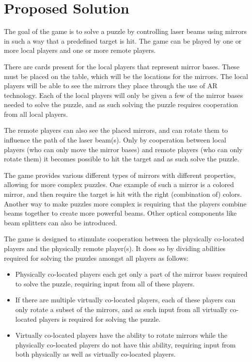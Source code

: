\chapter{Proposed Solution} \label{cha:solution}
	
	The goal of the game is to solve a puzzle by controlling laser beams 
	using mirrors in such a way that a predefined target is hit. The game 
	can be played by one or more local players and one or more remote players.
	
	There are cards present for the local players that represent mirror 
	bases. These must be placed on the table, which will be the locations 
	for the mirrors. The local players will be able to see the mirrors they 
	place through the use of AR technology. Each of the local players will 
	only be given a few of the mirror bases needed to solve the puzzle, and 
	as such solving the puzzle requires cooperation from all local players.
	
	The remote players can also see the placed mirrors, and can rotate them 
	to influence the path of the laser beam(s). Only by cooperation between 
	local players (who can only move the mirror bases) and remote players 
	(who can only rotate them) it becomes possible to hit the target and as 
	such solve the puzzle.
	
	The game provides various different types of mirrors with different 
	properties, allowing for more complex puzzles. One example of such a 
	mirror is a colored mirror, and then require the target is hit with the 
	right (combination of) colors. Another way to make puzzles more complex 
	is requiring that the players combine beams together to create more 
	powerful beams. Other optical components like beam splitters can also be 
	introduced.
	
	The game is designed to stimulate cooperation between the physically 
	co-located players and the physically remote player(s). It does so by 
	dividing abilities required for solving the puzzles amongst all players 
	as follows:
	
	\begin{itemize}
		\item Physically co-located players each get only a part of the 
		      mirror bases required to solve the puzzle, requiring input 
		      from all of these players.
		\item If there are multiple virtually co-located players, each of 
		      these players can only rotate a subset of the mirrors, and 
		      as such input from all virtually co-located players is 
		      required for solving the puzzle. 
		\item Virtually co-located players have the ability to rotate 
		      mirrors while the physically co-located players do not have 
		      this ability, requiring input from both physically as well
		      as virtually co-located players.
	\end{itemize}

